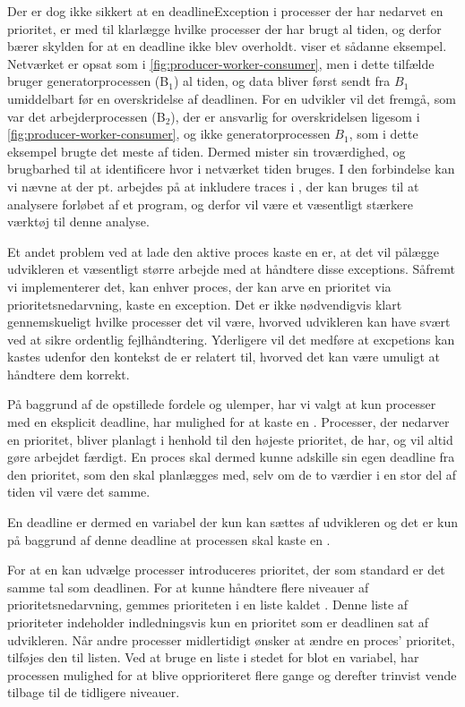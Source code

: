 Der er dog ikke sikkert at en deadlineException i processer der har nedarvet en prioritet, er med til klarlægge hvilke processer der har brugt al tiden, og derfor bærer skylden for at en deadline ikke blev overholdt.  viser et sådanne eksempel. Netværket er opsat som i \autoref{fig:producer-worker-consumer}, men i dette tilfælde bruger generatorprocessen (B$_1$) al tiden, og data bliver først sendt fra $B_1$ umiddelbart før en overskridelse af deadlinen. For en udvikler  vil det fremgå, som var det arbejderprocessen (B$_2$), der er ansvarlig for overskridelsen ligesom i \autoref{fig:producer-worker-consumer}, og ikke generatorprocessen $B_1$, som i dette eksempel brugte det meste af tiden. Dermed mister  sin troværdighed, og brugbarhed til at identificere hvor i netværket tiden bruges. I den forbindelse kan vi nævne at der pt. arbejdes på at inkludere traces i \pycsp, der kan bruges til at analysere forløbet af et program, og derfor vil være et væsentligt stærkere værktøj til denne analyse.  

Et andet problem ved at lade den aktive proces kaste en  er, at det vil pålægge udvikleren et væsentligt større arbejde med at håndtere disse exceptions. Såfremt vi implementerer det, kan enhver proces, der kan arve en prioritet via prioritetsnedarvning, kaste en exception. Det er ikke nødvendigvis klart gennemskueligt hvilke processer det vil være, hvorved udvikleren kan have svært ved at sikre ordentlig fejlhåndtering. Yderligere vil det medføre at excpetions kan kastes udenfor den kontekst de er relatert til, hvorved det kan være umuligt at håndtere dem korrekt.  

På baggrund af de opstillede fordele og ulemper, har vi valgt at kun processer med en eksplicit deadline, har mulighed for at kaste en . Processer, der nedarver en prioritet, bliver planlagt i henhold til den højeste prioritet, de har, og vil altid  gøre arbejdet færdigt. En proces skal dermed kunne adskille sin egen deadline fra den prioritet, som den skal planlægges med, selv om de to værdier i en stor del af tiden vil være det samme.

En deadline er dermed en variabel der kun kan sættes af udvikleren og det er kun på baggrund af denne deadline at  processen skal kaste en .

For at  \sched en kan udvælge processer introduceres prioritet, der som standard er det samme tal som deadlinen. For at kunne håndtere flere niveauer af prioritetsnedarvning,  gemmes prioriteten i en  liste kaldet . Denne liste af prioriteter  indeholder indledningsvis kun en prioritet som er deadlinen sat af udvikleren. Når andre processer  midlertidigt ønsker at ændre en proces' prioritet, tilføjes den til listen. Ved at bruge en liste i stedet for blot en variabel, har processen mulighed for at blive opprioriteret flere gange og derefter trinvist vende tilbage til de tidligere niveauer.

